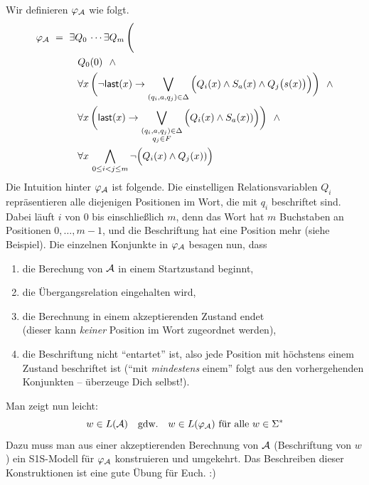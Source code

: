 \documentclass[fontsize=11pt, twoside=false, numbers=autoenddot]{scrbook}
\begin{document}
\begin{beweis}
  Wir definieren $\varphi_\mathcal{A}$ wie folgt.
  \begin{align*}
    \varphi_\Amc & ~=~ \exists Q_0\, \cdots \exists Q_m\,\Bigg( \\
                 & \hspace*{10mm} Q_0(0) ~~\land \\
                 & \hspace*{10mm} \forall x\,\bigg(\lnot \textsf{last}(x) \to \bigvee_{(q_i,a,q_j) \in \Delta} \Big(Q_i(x) \land S_a(x) \land Q_j\big(s(x)\big)\Big)\bigg) ~~\land \\
                 & \hspace*{10mm} \forall x\,\bigg(\textsf{last}(x) \to \bigvee_{\substack{(q_i,a,q_j) \in \Delta\\q_j \in F}} \Big(Q_i(x) \land S_a(x))\Big)\bigg) ~~\land \\
                 & \hspace*{10mm} \forall x\,\bigwedge_{0 \leq i < j \leq m} \lnot\Big(Q_i(x) \land Q_j(x))\Big)
  \end{align*}
  Die Intuition hinter $\varphi_\mathcal{A}$ ist folgende.
  Die einstelligen Relationsvariablen $Q_i$ repräsentieren alle diejenigen Positionen im Wort,
  die mit $q_i$ beschriftet sind. Dabei läuft $i$ von 0 bis einschließlich $m$,
  denn das Wort hat $m$ Buchstaben an Positionen $0,\dots,m-1$, und die Beschriftung hat eine Position mehr (siehe Beispiel).
  Die einzelnen Konjunkte in $\varphi_\mathcal{A}$ besagen nun, dass
  \begin{enumerate}
    \item
      die Berechung von $\mathcal{A}$ in einem Startzustand beginnt,
    \item
      die Übergangsrelation eingehalten wird,
    \item
      die Berechnung in einem akzeptierenden Zustand endet\\
      (dieser kann \emph{keiner} Position im Wort zugeordnet werden),
    \item
      die Beschriftung nicht "`entartet"' ist, also jede Position mit höchstens einem Zustand beschriftet ist
      ("`mit \emph{mindestens} einem"' folgt aus den vorhergehenden Konjunkten -- überzeuge Dich selbst!).
  \end{enumerate}
  Man zeigt nun leicht:
  \[
    w \in L(\mathcal{A})
    \quad\text{gdw.}\quad
    w \in L(\varphi_\mathcal{A}) \text{~für alle~} w \in \Sigma^*
  \]
  Dazu muss man aus einer akzeptierenden Berechnung von $\mathcal{A}$ (Beschriftung von $w$)
  ein S1S-Modell für $\varphi_\mathcal{A}$ konstruieren und umgekehrt.
  Das Beschreiben dieser Konstruktionen ist eine gute Übung für Euch. :)
  \qedhere
\end{beweis}%
\end{document}
